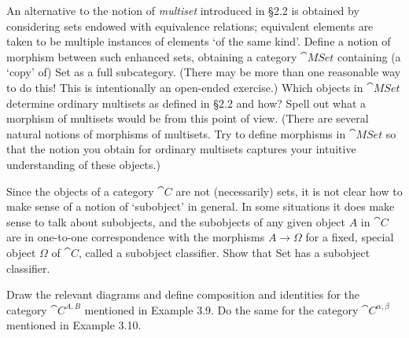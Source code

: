 \documentclass[parskip=full, draft]{scrartcl}
\begin{document}
\begin{prob}{9}
    An alternative to the notion of \textit{multiset}  introduced in \S 2.2 is obtained by considering sets endowed with equivalence relations; equivalent elements are taken to be multiple instances of elements `of the same kind'. Define a notion of morphism between such enhanced sets, obtaining a category \(\cat{MSet}\) containing (a `copy' of) Set as a full subcategory. (There may be more than one reasonable way to do this! This is intentionally an open-ended exercise.) Which objects in \(\cat{MSet}\) determine ordinary multisets as defined in §2.2 and how? Spell out what a morphism of multisets would be from this point of view. (There are several natural notions of morphisms of multisets. Try to define morphisms in \(\cat{MSet}\) so that the notion you obtain for ordinary multisets captures your intuitive understanding of these objects.)
\end{prob}
\begin{sol}
\end{sol}
\begin{prob}{10}
    Since the objects of a category \(\cat{C}\) are not (necessarily) sets, it is not clear how to make sense of a notion of `subobject' in general. In some situations it does make sense to talk about subobjects, and the subobjects of any given object \(A\) in \(\cat{C}\) are in one-to-one correspondence with the morphisms \(A \to \Omega\) for a fixed, special object \(\Omega\) of \(\cat{C}\), called a subobject classifier. Show that Set has a subobject classifier.
\end{prob}
\begin{sol}
\end{sol}
\begin{prob}{11}
    Draw the relevant diagrams and define composition and identities for the category \(\cat{C}^{A,B}\) mentioned in Example 3.9. Do the same for the category \(\cat{C}^{\alpha,\beta}\) mentioned in Example 3.10.
\end{prob}
\begin{sol}
\end{sol}
\end{document}
